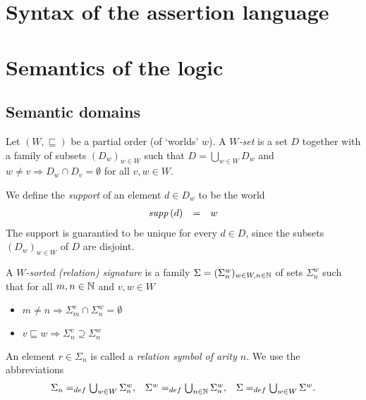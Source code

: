 \documentclass[12pt,a4paper]{report}
\begin{document}

\section{Syntax of the assertion language}



\section{Semantics of the logic}



\subsection{Semantic domains}

\begin{definition}
  Let $(W,\sqsubseteq)$ be a partial order (of `worlds' $w$).
  A {\em $W$-set} is a set $D$ together with a family of subsets $(D_w)_{w\in W}$ such that
  $D = \bigcup_{w\in W} D_w$ and $w \ne v \Rightarrow D_w \cap D_v = \emptyset$
  for all $v,w \in W$.
\end{definition}

We define the {\em support} of an element $d\in D_w$ to be the world
\[\begin{array}{rcl}
  \mathit{supp}\,(d) &=& w
\end{array}\]
The support is guarantied to be unique for every $d \in D$, since the subsets
$(D_w)_{w\in W}$ of $D$ are disjoint.

\begin{definition}
  A {\em $W$-sorted (relation) signature} is a family $\Sigma=(\Sigma^w_n)_{w\in W,n\in \mathbb N}$
  of sets $\Sigma^w_n$ such that for all $m,n\in \mathbb N$ and $v,w\in W$
  \begin{itemize}
    \item $m \ne n \Rightarrow \Sigma^v_m \cap \Sigma^w_n = \emptyset$
    \item $v \sqsubseteq w \Rightarrow \Sigma^v_n \supseteq \Sigma^w_n$
  \end{itemize}
\end{definition}

An element $r \in \Sigma_n$ is called a {\em relation symbol of arity $n$}. We use the abbreviations
\[\begin{array}{rcl}
  \Sigma_n =_{def} \bigcup_{w\in W} \Sigma^w_n, &
  \Sigma^w =_{def} \bigcup_{n\in \mathbb N} \Sigma^w_n, &
  \Sigma =_{def} \bigcup_{w\in W} \Sigma^w.
\end{array}\]
\end{document}

